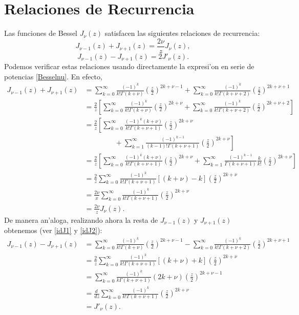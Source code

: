 \section{Relaciones de Recurrencia}
Las funciones de Bessel $J_\nu(z)$ satisfacen las siguientes relaciones de recurrencia:
\begin{equation}\label{rrJnu1}
J_{\nu-1}(z)+J_{\nu+1}(z)=\frac{2\nu}{z}J_\nu(z),
\end{equation}
\begin{equation}\label{rrJnu2}
J_{\nu-1}(z)-J_{\nu+1}(z)=2J'_\nu(z).
\end{equation}
Podemos verificar estas relaciones usando directamente la expresi'on en serie de potencias \eqref{Besselnu}. En efecto,
\begin{align}
J_{\nu-1}(z)+J_{\nu+1}(z) &= 
\sum_{k=0}^\infty\frac{(-1)^k}{k!\Gamma(k+\nu)}\left(\frac{z}{2}\right)^{2k+\nu-1} 
+\sum_{k=0}^\infty\frac{(-1)^k}{k!\Gamma(k+\nu+2)}\left(\frac{z}{2}\right)^{2k+\nu+1} \label{idJ1}\\
&= \frac{2}{z}\left[\sum_{k=0}^\infty\frac{(-1)^k}{k!\Gamma(k+\nu)}\left(\frac{z}{2}\right)^{2k+\nu} 
+\sum_{k=0}^\infty\frac{(-1)^k}{k!\Gamma(k+\nu+2)}\left(\frac{z}{2}\right)^{2k+\nu+2}\right] \\
&= \frac{2}{z}\left[\sum_{k=0}^\infty\frac{(-1)^k(k+\nu)}{k!\Gamma(k+\nu+1)}\left(\frac{z}{2}\right)^{2k+\nu} \right. \nonumber\\
&\ \left.\qquad\qquad +\sum_{k=1}^\infty\frac{(-1)^{k-1}}{(k-1)!\Gamma(k+\nu+1)}\left(\frac{z}{2}\right)^{2k+\nu}\right] \\
&= \frac{2}{z}\left[\sum_{k=0}^\infty\frac{(-1)^k(k+\nu)}{k!\Gamma(k+\nu+1)}\left(\frac{z}{2}\right)^{2k+\nu}  +\sum_{k=1}^\infty\frac{(-1)^{k-1}}{\Gamma(k+\nu+1)}\frac{k}{k!}\left(\frac{z}{2}\right)^{2k+\nu}\right] \\
&= \frac{2}{z}\sum_{k=0}^\infty\frac{(-1)^k}{k!\Gamma(k+\nu+1)}\left[(k+\nu)-k\right]\left(\frac{z}{2}\right)^{2k+\nu} \label{idJ2}\\
&= \frac{2\nu}{x}\sum_{k=0}^\infty\frac{(-1)^k}{k!\Gamma(k+\nu+1)}\left(\frac{z}{2}\right)^{2k+\nu} \\
&= \frac{2\nu}{z}J_\nu(z).
\end{align}
De manera an'aloga, realizando ahora la resta de $J_{\nu-1}(z)$ y $J_{\nu+1}(z)$ obtenemos (ver \eqref{idJ1} y \eqref{idJ2}):
\begin{align}
J_{\nu-1}(z)-J_{\nu+1}(z) &= 
\sum_{k=0}^\infty\frac{(-1)^k}{k!\Gamma(k+\nu)}\left(\frac{z}{2}\right)^{2k+\nu-1} 
-\sum_{k=0}^\infty\frac{(-1)^k}{k!\Gamma(k+\nu+2)}\left(\frac{z}{2}\right)^{2k+\nu+1} \\
&= \frac{2}{z}\sum_{k=0}^\infty\frac{(-1)^k}{k!\Gamma(k+\nu+1)}\left[(k+\nu)+k\right]\left(\frac{z}{2}\right)^{2k+\nu}\\
&= \sum_{k=0}^\infty\frac{(-1)^k}{k\Gamma(k+\nu+1)}(2k+\nu)\left(\frac{z}{2}\right)^{2k+\nu-1}\\
&= \frac{d\ }{dz}\sum_{k=0}^\infty\frac{(-1)^k}{k!\Gamma(k+\nu+1)}\left(\frac{z}{2}\right)^{2k+\nu} \\
&= J'_\nu(z).
\end{align}
